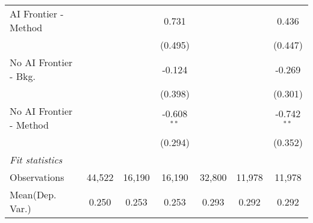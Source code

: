 \begin{tabular}{lcccccc}
   AI Frontier - Method    &               &                & 0.731         &               &                & 0.436\\   
                           &               &                & (0.495)       &               &                & (0.447)\\   
   No AI Frontier - Bkg.   &               &                & -0.124        &               &                & -0.269\\   
                           &               &                & (0.398)       &               &                & (0.301)\\   
   No AI Frontier - Method &               &                & -0.608$^{**}$ &               &                & -0.742$^{**}$\\   
                           &               &                & (0.294)       &               &                & (0.352)\\   
   \midrule
   \emph{Fit statistics}\\
   Observations            & 44,522        & 16,190         & 16,190        & 32,800        & 11,978         & 11,978\\  
Mean(Dep. Var.) & 0.250 & 0.253 & 0.253 & 0.293 & 0.292 & 0.292 \\
   

\end{tabular}
